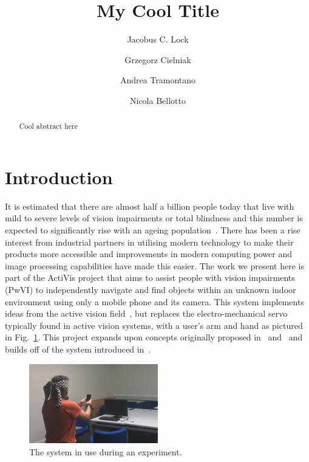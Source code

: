 \documentclass[runningheads]{llncs}
\begin{document}
\title{My Cool Title}

\author{Jacobus C. Lock \and
  Grzegorz Cielniak \and
  Andrea Tramontano \and
  Nicola Bellotto
}

\maketitle

\begin{abstract}
  Cool abstract here
\end{abstract}

\section{Introduction}

It is estimated that there are almost half a billion people today that live with mild to severe levels of vision impairments or total blindness and this number is expected to significantly rise with an ageing population~\cite{bourne2017magnitude}.
There has been a rise interest from industrial partners in utilising modern technology to make their products more accessible and improvements in modern computing power and image processing capabilities have made this easier.
The work we present here is part of the ActiVis project that aims to assist people with vision impairments (PwVI) to independently navigate and find objects within an unknown indoor environment using only a mobile phone and its camera.
This system implements ideas from the active vision field~\cite{bajcsy2017,bellotto2013}, but replaces the electro-mechanical servo typically found in active vision systems, with a user's arm and hand as pictured in Fig.~\ref{fig:system-in-use}.
This project expands upon concepts originally proposed in~\cite{bellotto2013} and~\cite{lock2017portable} and builds off of the system introduced in~\cite{lock2019active}.

\begin{figure}
  \centering
  \includegraphics[width=0.5\textwidth]{figures/system_use.png}
  \caption{The system in use during an experiment. }\label{fig:system-in-use}
\end{figure}
\end{document}
